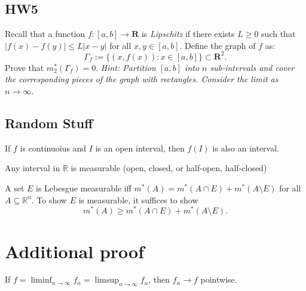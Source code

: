 \section{HW5}
\begin{problem}
    Recall that a function $f: [a, b] \to \mathbf{R}$ is \textit{Lipschitz} if there exists $L \geq 0$ such that $|f(x) - f(y)| \leq L|x-y|$ for all $x, y \in [a, b]$. 
Define the graph of $f$ as:
\[
\Gamma_f := \{(x, f(x)) : x \in [a, b]\} \subset \mathbf{R}^2.
\]
Prove that $m^*_2(\Gamma_f) = 0$. 
\textit{Hint: Partition $[a, b]$ into $n$ sub-intervals and cover the corresponding pieces of the graph with rectangles. Consider the limit as $n \to \infty$.}
\end{problem}

\section{Random Stuff}
\begin{theorem}
    If \(f\) is continuoius and \(I\) is an open interval, then \(f(I)\) is also an interval.   
\end{theorem}

\begin{theorem}
    Any interval in \(\mathbb{R}\) is measurable (open, closed, or half-open, half-closed) 
\end{theorem}

\begin{theorem}
    A set \(E\) is Lebesgue measurable iff \(m^*(A) = m^*(A \cap E) + m^*(A \setminus E)\) for all \(A \subseteq \mathbb{R}^n\). To show \(E\) is measurable, it suffices to show 
    \[
        m^*(A) \ge m^*(A \cap E) + m^*(A \setminus E).
    \]    
\end{theorem}

\chapter{Additional proof}
\begin{theorem} \label{thm: linf eq lsup eq f, then converge}
    If \(f = \liminf_{n \to \infty} f_n = \limsup_{n \to \infty} f_n  \), then \(f_n \to f\) pointwise.  
\end{theorem}

